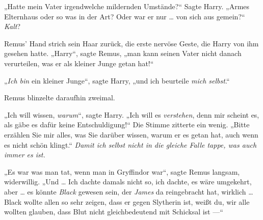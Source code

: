 „Hatte mein Vater irgendwelche mildernden Umstände?“ Sagte Harry.
„Armes Elternhaus oder so was in der Art? Oder war er nur … von sich aus gemein?“ \emph{Kalt}?

Remus’ Hand strich sein Haar zurück, die erste nervöse Geste, die Harry von ihm gesehen hatte.
„Harry“, sagte Remus, „man kann seinen Vater nicht danach verurteilen, was er als kleiner Junge getan hat!“

„\emph{Ich bin} ein kleiner Junge“, sagte Harry, „und ich beurteile \emph{mich selbst}.“

Remus blinzelte daraufhin zweimal.

„Ich will wissen, \emph{warum}“, sagte Harry.
„Ich will es \emph{verstehen}, denn mir scheint es, als gäbe es dafür keine Entschuldigung!“ Die Stimme zitterte ein wenig.
„Bitte erzählen Sie mir alles, was Sie darüber wissen, warum er es getan hat, auch wenn es nicht schön klingt.“ \emph{Damit ich selbst nicht in die gleiche Falle tappe, was auch immer es ist.}

„Es war was man tat, wenn man in Gryffindor war“, sagte Remus langsam, widerwillig.
„Und … Ich dachte damals nicht so, ich dachte, es wäre umgekehrt, aber … es könnte \emph{Black} gewesen sein, der \emph{James} da reingebracht hat, wirklich … Black wollte allen so sehr zeigen, dass er gegen Slytherin ist, weißt du, wir alle wollten glauben, dass Blut nicht gleichbedeutend mit Schicksal ist —“

